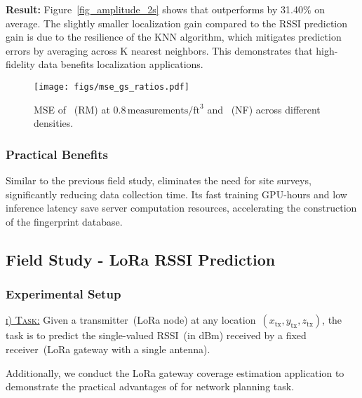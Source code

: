 \textbf{Result:}  
Figure~\ref{fig_amplitude_2s} shows that \ourSystem outperforms \nerft by 31.40\% on average.  
The slightly smaller localization gain compared to the RSSI prediction gain is due to the resilience of the KNN algorithm, which mitigates prediction errors by averaging across K nearest neighbors.  
This demonstrates that high-fidelity data benefits localization applications.  


\begin{figure}[!tp]
	{\texttt{[image: figs/mse\_gs\_ratios.pdf]}}
\caption{MSE of \ourSystem~(RM) at 0.8\,\(\text{measurements}/\text{ft}^3\) and \nerft~(NF) across different densities.}
\label{fig_density_3dgs_nerft_mse}
\Description[]{}
\end{figure}


\subsubsection{Practical Benefits}\label{sec_ble_loc}  
Similar to the previous field study, \ourSystem eliminates the need for site surveys, significantly reducing data collection time.  
Its fast training GPU-hours and low inference latency save server computation resources, accelerating the construction of the fingerprint database.  



\subsection{Field Study - LoRa RSSI Prediction}\label{sec_lora_gateway}



\subsubsection{Experimental Setup}

\underline{\textsc{i) Task:}}
Given a transmitter~(LoRa node) at any location~$\left(x_{\text{tx}}, y_{\text{tx}}, z_{\text{tx}}\right)$, the task is to predict the single-valued RSSI~(in dBm) received by a fixed receiver~(LoRa gateway with a single antenna).




Additionally, we conduct the LoRa gateway coverage estimation application to demonstrate the practical advantages of \ourSystem for network planning task.  




